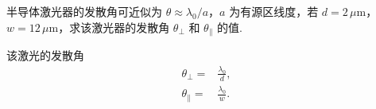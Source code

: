 \documentclass{assignment}
\begin{document}
\begin{prob}
    半导体激光器的发散角可近似为 $\theta\approx\lambda_0/a$，$a$ 为有源区线度，若 $d=2\,\mu$m，$w=12\,\mu$m，求该激光器的发散角 $\theta_{\perp}$ 和 $\theta_{\parallel}$ 的值.
\end{prob}
\begin{sol}
    该激光的发散角
    \begin{align}
        \theta_{\perp}=&\frac{\lambda_0}{d},\\
        \theta_{\parallel}=&\frac{\lambda_0}{w}.
    \end{align}
\end{sol}
\end{document}
